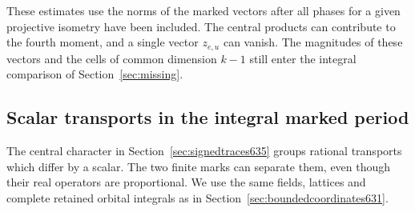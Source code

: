 \documentclass[a4paper,11pt]{article}
\theoremstyle{definition}
\theoremstyle{remark}
\numberwithin{equation}{section}
\begin{document}
These estimates use the norms of the marked vectors after all
phases for a given projective isometry have been included.
The central products can contribute to the fourth moment, and a
single vector \(z_{e,u}\) can vanish. The magnitudes of these
vectors and the cells of common dimension \(k-1\) still enter
the integral comparison of Section~\ref{sec:missing}.


\subsection{Scalar transports in the integral marked period}
\label{sec:scalartransports636}

The central character in Section~\ref{sec:signedtraces635} groups
rational transports which differ by a scalar. The two finite marks
can separate them, even though their real operators are proportional.
We use the same fields, lattices and complete retained orbital
integrals as in Section~\ref{sec:boundedcoordinates631}.
\end{document}
